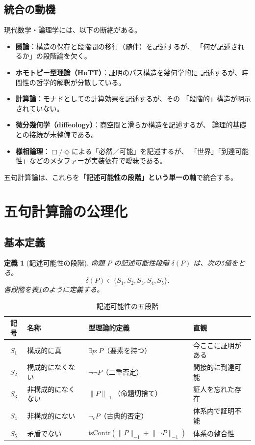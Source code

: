 \documentclass[11pt,a4paper]{ltjsarticle}
\newtheorem{definition}{定義}[section]
\theoremstyle{remark}
\newcommand{\isContr}{\mathrm{isContr}}
\begin{document}
\subsection{統合の動機}

現代数学・論理学には、以下の断絶がある。

\begin{itemize}
  \item \textbf{圏論}：構造の保存と段階間の移行（随伴）を記述するが、
  「何が記述されるか」の段階論を欠く。
  \item \textbf{ホモトピー型理論（HoTT）}：証明のパス構造を幾何学的に
  記述するが、時間性の哲学的解釈が分散している。
  \item \textbf{計算論}：モナドとしての計算効果を記述するが、その
  「段階的」構造が明示されていない。
  \item \textbf{微分幾何学（diffeology）}：商空間と滑らか構造を記述するが、
  論理的基礎との接続が未整備である。
  \item \textbf{様相論理}：$\Box/\Diamond$による「必然／可能」を記述するが、
  「世界」「到達可能性」などのメタファーが実装依存で曖昧である。
\end{itemize}

五句計算論は、これらを\textbf{「記述可能性の段階」という単一の軸}で統合する。

\section{五句計算論の公理化}

\subsection{基本定義}

\begin{definition}[記述可能性の段階]
命題 $P$ の記述可能性段階 $\delta(P)$ は、次の5値をとる。
\[
  \delta(P)\in\{S_1,S_2,S_3,S_4,S_5\}.
\]
各段階を表\ref{tab:stages}のように定義する。
\end{definition}

\begin{table}[htbp]
\centering
\caption{記述可能性の五段階}
\label{tab:stages}
\small
\begin{tabularx}{\textwidth}{@{}c l >{\raggedright\arraybackslash}X >{\raggedright\arraybackslash}X@{}}
\toprule
記号 & 名称 & 型理論的定義 & 直観 \\
\midrule
$S_1$ & 構成的に真 & $\exists p:P$（要素を持つ） & 今ここに証明がある \\
$S_2$ & 構成的になくない & $\neg\neg P$（二重否定） & 間接的に到達可能 \\
$S_3$ & 非構成的になくない & $\lVert P\rVert_{-1}$（命題切捨て） & 証人を忘れた存在 \\
$S_4$ & 非構成的にない & $\neg_cP$（古典的否定） & 体系内で証明不能 \\
$S_5$ & 矛盾でない & $\isContr(\lVert P\rVert_{-1}+\lVert\neg P\rVert_{-1})$ & 体系の整合性 \\
\bottomrule
\end{tabularx}
\end{table}
\end{document}
